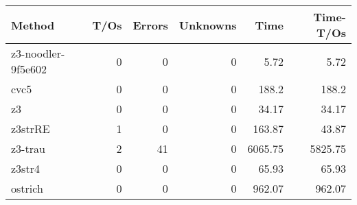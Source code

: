 \begin{tabular}{lrrrrr}
\hline
 Method             &   T/Os &   Errors &   Unknowns &    Time &   Time-T/Os \\
\hline
 z3-noodler-9f5e602 &      0 &        0 &          0 &    5.72 &        5.72 \\
 cvc5               &      0 &        0 &          0 &  188.2  &      188.2  \\
 z3                 &      0 &        0 &          0 &   34.17 &       34.17 \\
 z3strRE            &      1 &        0 &          0 &  163.87 &       43.87 \\
 z3-trau            &      2 &       41 &          0 & 6065.75 &     5825.75 \\
 z3str4             &      0 &        0 &          0 &   65.93 &       65.93 \\
 ostrich            &      0 &        0 &          0 &  962.07 &      962.07 \\
\hline
\end{tabular}
